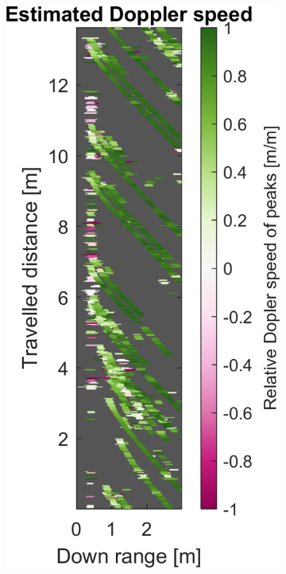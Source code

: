\begin{figure}[htbp]
\begin{subfigure}[t]{0.475\linewidth}
    \end{subfigure}%
    \hfill%
    \begin{subfigure}[t]{0.475\linewidth}
        \centering
        \includegraphics[width=\linewidth,max height=.475\textheight]{gfx/results/publicrestroom_doppler.png}

\end{subfigure}
\end{figure}
